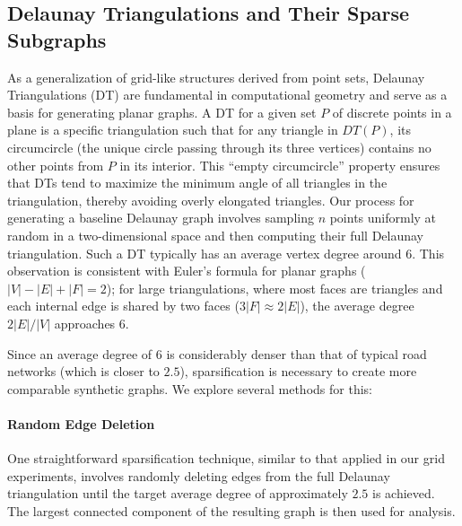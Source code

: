 















\subsection{Delaunay Triangulations and Their Sparse Subgraphs}
\label{sec:synthetic:delaunay_variants}

As a generalization of grid-like structures derived from point sets, Delaunay Triangulations (DT) are fundamental in computational geometry and serve as a basis for generating planar graphs.
A DT for a given set \(P\) of discrete points in a plane is a specific triangulation such that for any triangle in \(DT(P)\), its circumcircle (the unique circle passing through its three vertices) contains no other points from \(P\) in its interior.
This \enquote{empty circumcircle} property ensures that DTs tend to maximize the minimum angle of all triangles in the triangulation, thereby avoiding overly elongated triangles.
Our process for generating a baseline Delaunay graph involves sampling \(n\) points uniformly at random in a two-dimensional space and then computing their full Delaunay triangulation.
Such a DT typically has an average vertex degree around 6. This observation is consistent with Euler's formula for planar graphs (\(|V| - |E| + |F| = 2\)); for large triangulations, where most faces are triangles and each internal edge is shared by two faces (\(3|F| \approx 2|E|\)), the average degree \(2|E|/|V|\) approaches 6.

Since an average degree of 6 is considerably denser than that of typical road networks (which is closer to \(2.5\)), sparsification is necessary to create more comparable synthetic graphs. We explore several methods for this:

\paragraph{Random Edge Deletion}
One straightforward sparsification technique, similar to that applied in our grid experiments, involves randomly deleting edges from the full Delaunay triangulation until the target average degree of approximately \(2.5\) is achieved. The largest connected component of the resulting graph is then used for analysis.

